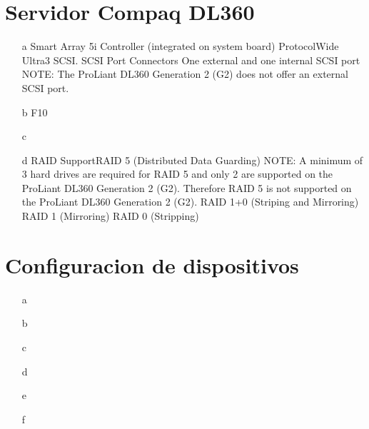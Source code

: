 \documentclass[a4paper]{article}
\begin{document}
%
\section{Servidor Compaq DL360}
\begin{enumerate}
\item[a] Smart Array 5i Controller 
(integrated on system board)
ProtocolWide Ultra3 SCSI. SCSI Port Connectors One external and one internal SCSI port
NOTE: The ProLiant DL360 Generation 2 (G2) does not offer an external SCSI port.
\item[b] F10
\item[c]
\item[d]RAID SupportRAID 5 (Distributed Data Guarding)
NOTE: A minimum of 3 hard drives are required for RAID 5 and only 2 are supported on the ProLiant DL360 Generation 2 (G2). Therefore RAID 5 is not supported on the ProLiant DL360 Generation 2 (G2). 
RAID 1+0 (Striping and Mirroring)
RAID 1 (Mirroring)
RAID 0 (Stripping)
\end{enumerate}
%
\section{Configuracion de dispositivos}
\begin{enumerate}
\item[a]
\item[b]
\item[c]
\item[d]
\item[e]
\item[f]
\end{enumerate}
%
\end{document}
